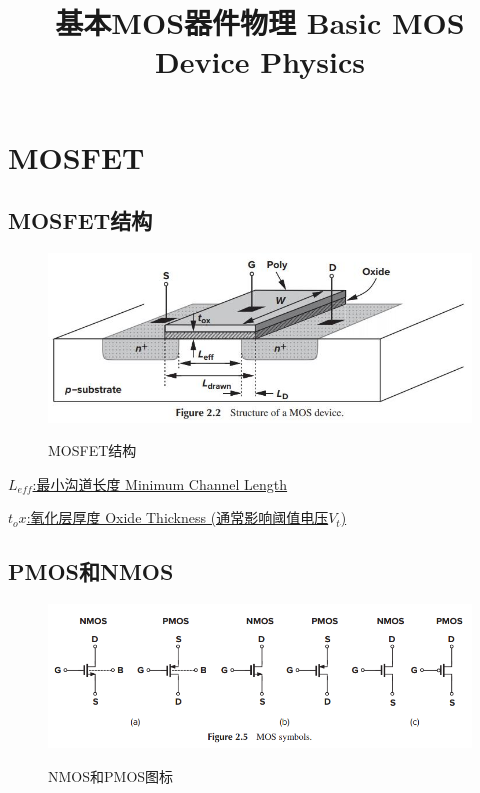 \documentclass[]{ctexart}
\title{基本MOS器件物理 Basic MOS Device Physics}
\begin{document}
\section{MOSFET}
\subsection{MOSFET结构}
    \begin{figure}[ht]
        \centering
        \includegraphics[scale=0.6]{MOSFET_Strcture}
        \label{图1}
        \caption{MOSFET结构}
    \end{figure}
    
    \underline{$L_{eff}$:最小沟道长度 Minimum Channel Length}
    
    \underline{$t_ox$:氧化层厚度 Oxide Thickness (通常影响阈值电压$V_t$)}
\subsection{PMOS和NMOS}
    \begin{figure}[ht]
        \centering
        \includegraphics[width=\columnwidth]{NMOS_PMOS_Simbol}
        \label{图2}
        \caption{NMOS和PMOS图标}
    \end{figure}
    
\end{document}
